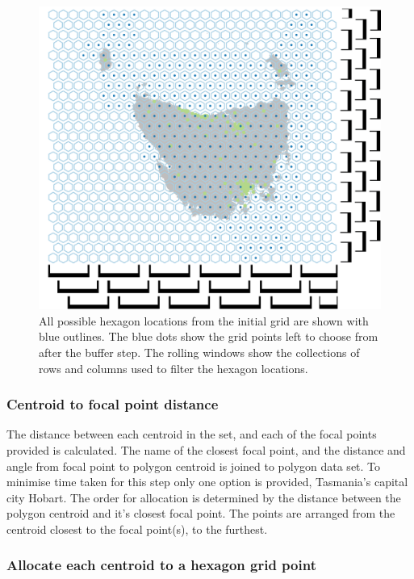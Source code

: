 \documentclass{monashthesis}
\begin{document}
\begin{figure}[H]
\centering
\includegraphics[width=16cm]{figures/03-algorithm/3grid.png}
\caption{\label{fig:filter-grid}All possible hexagon locations from the initial grid are shown with blue outlines. The blue dots show the grid points left to choose from after the buffer step. The rolling windows show the collections of rows and columns used to filter the hexagon locations.}
\end{figure}

\hypertarget{centroid-to-focal-point-distance}{%
\subsubsection{Centroid to focal point distance}\label{centroid-to-focal-point-distance}}

The distance between each centroid in the set, and each of the focal points provided is calculated. The name of the closest focal point, and the distance and angle from focal point to polygon centroid is joined to polygon data set. To minimise time taken for this step only one option is provided, Tasmania's capital city Hobart.
The order for allocation is determined by the distance between the polygon centroid and it's closest focal point. The points are arranged from the centroid closest to the focal point(s), to the furthest.

\hypertarget{allocate-each-centroid-to-a-hexagon-grid-point}{%
\subsubsection{Allocate each centroid to a hexagon grid point}\label{allocate-each-centroid-to-a-hexagon-grid-point}}
\end{document}
